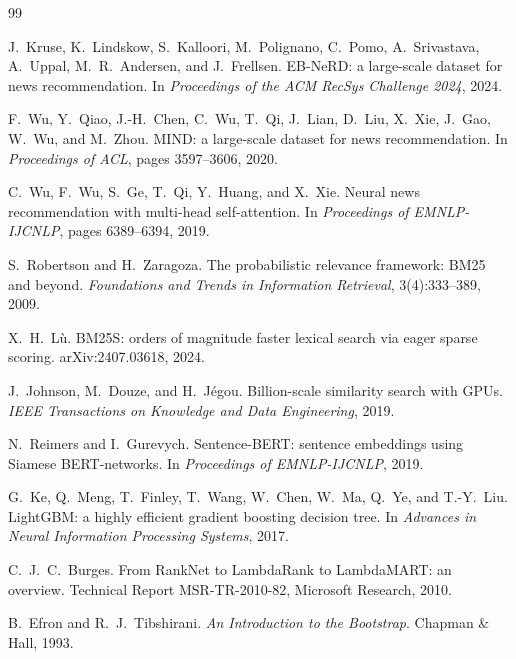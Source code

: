 \begingroup
\small
\renewcommand{\section}[2]{\subsection*{References}}
\begin{thebibliography}{99}
\setlength{\itemsep}{1pt}

 J.~Kruse, K.~Lindskow, S.~Kalloori, M.~Polignano, C.~Pomo, A.~Srivastava,
A.~Uppal, M.~R.~Andersen, and J.~Frellsen. EB-NeRD: a large-scale dataset for news
recommendation. In \emph{Proceedings of the ACM RecSys Challenge 2024}, 2024.

 F.~Wu, Y.~Qiao, J.-H.~Chen, C.~Wu, T.~Qi, J.~Lian, D.~Liu, X.~Xie, J.~Gao,
W.~Wu, and M.~Zhou. MIND: a large-scale dataset for news recommendation. In \emph{Proceedings of
ACL}, pages 3597--3606, 2020.

 C.~Wu, F.~Wu, S.~Ge, T.~Qi, Y.~Huang, and X.~Xie. Neural news recommendation
with multi-head self-attention. In \emph{Proceedings of EMNLP-IJCNLP}, pages 6389--6394, 2019.

 S.~Robertson and H.~Zaragoza. The probabilistic relevance framework: BM25
and beyond. \emph{Foundations and Trends in Information Retrieval}, 3(4):333--389, 2009.

 X.~H.~L\`u. BM25S: orders of magnitude faster lexical search via eager
sparse scoring. arXiv:2407.03618, 2024.

 J.~Johnson, M.~Douze, and H.~J\'egou. Billion-scale similarity search
with GPUs. \emph{IEEE Transactions on Knowledge and Data Engineering}, 2019.

 N.~Reimers and I.~Gurevych. Sentence-BERT: sentence embeddings using Siamese
BERT-networks. In \emph{Proceedings of EMNLP-IJCNLP}, 2019.

 G.~Ke, Q.~Meng, T.~Finley, T.~Wang, W.~Chen, W.~Ma, Q.~Ye, and T.-Y.~Liu.
LightGBM: a highly efficient gradient boosting decision tree. In \emph{Advances in Neural
Information Processing Systems}, 2017.

 C.~J.~C.~Burges. From RankNet to LambdaRank to LambdaMART: an overview.
Technical Report MSR-TR-2010-82, Microsoft Research, 2010.

 B.~Efron and R.~J.~Tibshirani. \emph{An Introduction to the Bootstrap}.
Chapman \& Hall, 1993.

\end{thebibliography}
\endgroup
